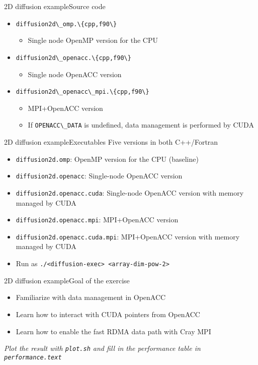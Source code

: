 \documentclass[aspectratio=169,12pt]{beamer}
\newcommand\shinline[2][]{\lstinline[style=shstyle,basicstyle=\ttfamily,#1]!#2!}
\begin{document}
\begin{frame}[fragile]{2D diffusion example}{Source code}
  \begin{itemize}
  \item \shinline{diffusion2d\_omp.\{cpp,f90\}}
    \begin{itemize}
    \item Single node OpenMP version for the CPU
    \end{itemize}
  \item \shinline{diffusion2d\_openacc.\{cpp,f90\}}
    \begin{itemize}
    \item Single node OpenACC version
    \end{itemize}
  \item \shinline{diffusion2d\_openacc\_mpi.\{cpp,f90\}}
    \begin{itemize}
    \item MPI+OpenACC version
    \item If \shinline{OPENACC\_DATA} is undefined, data management is performed by CUDA
    \end{itemize}
  \end{itemize}
\end{frame}


\begin{frame}[fragile]{2D diffusion example}{Executables}
  Five versions in both C++/Fortran
  \vspace\baselineskip
  \begin{itemize}
  \item \shinline{diffusion2d.omp}: OpenMP version for the CPU (baseline)
  \item \shinline{diffusion2d.openacc}: Single-node OpenACC version
  \item \shinline{diffusion2d.openacc.cuda}: Single-node OpenACC version with memory managed by CUDA
  \item \shinline{diffusion2d.openacc.mpi}: MPI+OpenACC version
  \item \shinline{diffusion2d.openacc.cuda.mpi}: MPI+OpenACC version with memory managed by CUDA
    \vfill
  \item Run as \texttt{./<diffusion-exec> <array-dim-pow-2>}
  \end{itemize}
\end{frame}

\begin{frame}[fragile]{2D diffusion example}{Goal of the exercise}
  \begin{itemize}
  \item Familiarize with data management in OpenACC
  \item Learn how to interact with CUDA pointers from OpenACC
  \item Learn how to enable the fast RDMA data path with Cray MPI
  \end{itemize}
  \vfill
  \emph{Plot the result with \shinline{plot.sh} and fill in the performance table in \shinline{performance.text}}
\end{frame}
\end{document}
